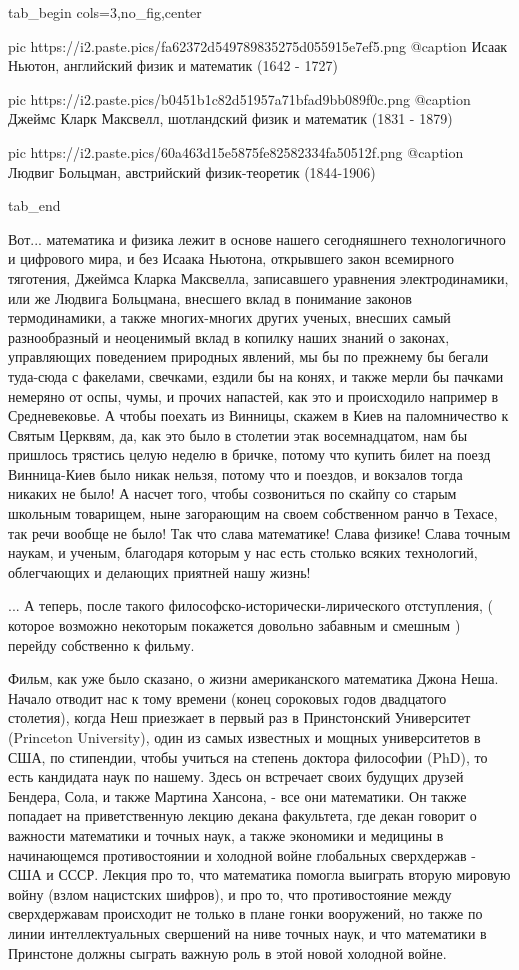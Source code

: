 \ifcmt
  tab_begin cols=3,no_fig,center

     pic https://i2.paste.pics/fa62372d549789835275d055915e7ef5.png
		 @caption Исаак Ньютон, английский физик и математик (1642 - 1727)

		 pic https://i2.paste.pics/b0451b1c82d51957a71bfad9bb089f0c.png
		 @caption Джеймс Кларк Максвелл, шотландский физик и математик (1831 - 1879)

		 pic https://i2.paste.pics/60a463d15e5875fe82582334fa50512f.png
		 @caption Людвиг Больцман, австрийский физик-теоретик (1844-1906)

  tab_end
\fi

Вот...  математика и физика лежит в основе нашего сегодняшнего технологичного и
цифрового мира, и без Исаака Ньютона, открывшего закон всемирного тяготения,
Джеймса Кларка Максвелла, записавшего уравнения электродинамики, или же Людвига
Больцмана, внесшего вклад в понимание законов термодинамики, а также многих-многих других
ученых, внесших самый разнообразный и неоценимый вклад в копилку наших знаний о
законах, управляющих поведением природных явлений, мы бы по прежнему бы бегали
туда-сюда с факелами, свечками, ездили бы на конях, и также мерли бы пачками
немеряно от оспы, чумы, и прочих напастей, как это и происходило например в
Средневековье.  А чтобы поехать из Винницы, скажем в Киев на паломничество к
Святым Церквям, да, как это было в столетии этак восемнадцатом, нам бы пришлось
трястись целую неделю в бричке, потому что купить билет на поезд Винница-Киев
было никак нельзя, потому что и поездов, и вокзалов тогда никаких не было! А
насчет того, чтобы созвониться по скайпу со старым школьным товарищем, ныне
загорающим на своем собственном ранчо в Техасе, так речи вообще не было! Так
что слава математике! Слава физике!  Слава точным наукам, и ученым, благодаря
которым у нас есть столько всяких технологий, облегчающих и делающих приятней
нашу жизнь!

... А теперь, после такого философско-исторически-лирического отступления, (
которое возможно некоторым покажется довольно забавным и смешным ) перейду
собственно к фильму.

Фильм, как уже было сказано, о жизни американского математика Джона Неша.
Начало отводит нас к тому времени (конец сороковых годов двадцатого столетия),
когда Неш приезжает в первый раз в Принстонский Университет (Princeton
University), один из самых известных и мощных университетов в США, по
стипендии, чтобы учиться на степень доктора философии (PhD), то есть кандидата
наук по нашему.  Здесь он встречает своих будущих друзей Бендера, Сола, и также
Мартина Хансона, - все они математики. Он также попадает на приветственную
лекцию декана факультета, где декан говорит о важности математики и точных
наук, а также экономики и медицины в начинающемся противостоянии и холодной
войне глобальных сверхдержав - США и СССР.  Лекция про то, что математика
помогла выиграть вторую мировую войну (взлом нацистских шифров), и про то, что
противостояние между сверхдержавам происходит не только в плане гонки
вооружений, но также по линии интеллектуальных свершений на ниве точных наук, и
что математики в Принстоне должны сыграть важную роль в этой новой холодной
войне. 


